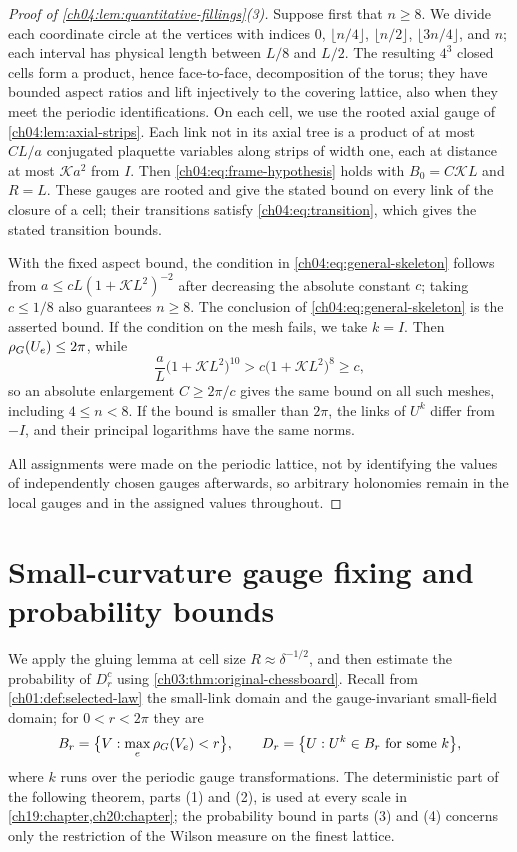 \begin{proof}[Proof of \cref{ch04:lem:quantitative-fillings}(3)]
Suppose first that $n\ge8$. We divide each coordinate circle at the vertices with indices $0$, $\lfloor n/4\rfloor$, $\lfloor n/2\rfloor$, $\lfloor3n/4\rfloor$, and $n$; each interval has physical length between $L/8$ and $L/2$. The resulting $4^3$ closed cells form a product, hence face-to-face, decomposition of the torus; they have bounded aspect ratios and lift injectively to the covering lattice, also when they meet the periodic identifications. On each cell, we use the rooted axial gauge of \cref{ch04:lem:axial-strips}. Each link not in its axial tree is a product of at most $CL/a$ conjugated plaquette variables along strips of width one, each at distance at most $\mathscr Ka^2$ from $I$. Then \eqref{ch04:eq:frame-hypothesis} holds with $B_0=C\mathscr KL$ and $R=L$. These gauges are rooted and give the stated bound on every link of the closure of a cell; their transitions satisfy \eqref{ch04:eq:transition}, which gives the stated transition bounds.

With the fixed aspect bound, the condition in \eqref{ch04:eq:general-skeleton} follows from $a\le cL(1+\mathscr KL^2)^{-2}$ after decreasing the absolute constant $c$; taking $c\le1/8$ also guarantees $n\ge8$. The conclusion of \eqref{ch04:eq:general-skeleton} is the asserted bound. If the condition on the mesh fails, we take $k=I$. Then $\rho_G(U_e)\le2\pi$, while
\[
 \frac aL\bigl(1+\mathscr KL^2\bigr)^{10}>c\bigl(1+\mathscr KL^2\bigr)^8\ge c,
\]
so an absolute enlargement $C\ge2\pi/c$ gives the same bound on all such meshes, including $4\le n<8$. If the bound is smaller than $2\pi$, the links of $U^k$ differ from $-I$, and their principal logarithms have the same norms.

All assignments were made on the periodic lattice, not by identifying the values of independently chosen gauges afterwards, so arbitrary holonomies remain in the local gauges and in the assigned values throughout.
\end{proof}

\section{Small-curvature gauge fixing and probability bounds}\label{ch04:sec:small-curvature}

We apply the gluing lemma at cell size $R\approx\delta^{-1/2}$, and then estimate the probability of $D_r^c$ using \cref{ch03:thm:original-chessboard}. Recall from \cref{ch01:def:selected-law} the small-link domain and the gauge-invariant small-field domain; for $0<r<2\pi$ they are
\[
 B_r=\bigl\{V:\max_e\rho_G(V_e)<r\bigr\},\qquad D_r=\bigl\{U:U^k\in B_r\text{ for some }k\bigr\},
\]
where $k$ runs over the periodic gauge transformations.
The deterministic part of the following theorem, parts (1) and (2), is used at every scale in \cref{ch19:chapter,ch20:chapter}; the probability bound in parts (3) and (4) concerns only the restriction of the Wilson measure on the finest lattice.

